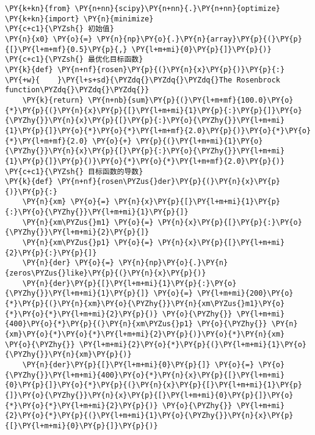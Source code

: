    \begin{tcolorbox}[breakable, size=fbox, boxrule=1pt, pad at break*=1mm,colback=cellbackground, colframe=cellborder]
\begin{Verbatim}[commandchars=\\\{\}]
\PY{k+kn}{from} \PY{n+nn}{scipy}\PY{n+nn}{.}\PY{n+nn}{optimize} \PY{k+kn}{import} \PY{n}{minimize}
\PY{c+c1}{\PYZsh{} 初始值}
\PY{n}{x0} \PY{o}{=} \PY{n}{np}\PY{o}{.}\PY{n}{array}\PY{p}{(}\PY{p}{[}\PY{l+m+mf}{0.5}\PY{p}{,} \PY{l+m+mi}{0}\PY{p}{]}\PY{p}{)}
\PY{c+c1}{\PYZsh{} 最优化目标函数}
\PY{k}{def} \PY{n+nf}{rosen}\PY{p}{(}\PY{n}{x}\PY{p}{)}\PY{p}{:}
\PY{+w}{    }\PY{l+s+sd}{\PYZdq{}\PYZdq{}\PYZdq{}The Rosenbrock function\PYZdq{}\PYZdq{}\PYZdq{}}
    \PY{k}{return} \PY{n+nb}{sum}\PY{p}{(}\PY{l+m+mf}{100.0}\PY{o}{*}\PY{p}{(}\PY{n}{x}\PY{p}{[}\PY{l+m+mi}{1}\PY{p}{:}\PY{p}{]}\PY{o}{\PYZhy{}}\PY{n}{x}\PY{p}{[}\PY{p}{:}\PY{o}{\PYZhy{}}\PY{l+m+mi}{1}\PY{p}{]}\PY{o}{*}\PY{o}{*}\PY{l+m+mf}{2.0}\PY{p}{)}\PY{o}{*}\PY{o}{*}\PY{l+m+mf}{2.0} \PY{o}{+} \PY{p}{(}\PY{l+m+mi}{1}\PY{o}{\PYZhy{}}\PY{n}{x}\PY{p}{[}\PY{p}{:}\PY{o}{\PYZhy{}}\PY{l+m+mi}{1}\PY{p}{]}\PY{p}{)}\PY{o}{*}\PY{o}{*}\PY{l+m+mf}{2.0}\PY{p}{)}
\PY{c+c1}{\PYZsh{} 目标函数的导数}
\PY{k}{def} \PY{n+nf}{rosen\PYZus{}der}\PY{p}{(}\PY{n}{x}\PY{p}{)}\PY{p}{:}
    \PY{n}{xm} \PY{o}{=} \PY{n}{x}\PY{p}{[}\PY{l+m+mi}{1}\PY{p}{:}\PY{o}{\PYZhy{}}\PY{l+m+mi}{1}\PY{p}{]}
    \PY{n}{xm\PYZus{}m1} \PY{o}{=} \PY{n}{x}\PY{p}{[}\PY{p}{:}\PY{o}{\PYZhy{}}\PY{l+m+mi}{2}\PY{p}{]}
    \PY{n}{xm\PYZus{}p1} \PY{o}{=} \PY{n}{x}\PY{p}{[}\PY{l+m+mi}{2}\PY{p}{:}\PY{p}{]}
    \PY{n}{der} \PY{o}{=} \PY{n}{np}\PY{o}{.}\PY{n}{zeros\PYZus{}like}\PY{p}{(}\PY{n}{x}\PY{p}{)}
    \PY{n}{der}\PY{p}{[}\PY{l+m+mi}{1}\PY{p}{:}\PY{o}{\PYZhy{}}\PY{l+m+mi}{1}\PY{p}{]} \PY{o}{=} \PY{l+m+mi}{200}\PY{o}{*}\PY{p}{(}\PY{n}{xm}\PY{o}{\PYZhy{}}\PY{n}{xm\PYZus{}m1}\PY{o}{*}\PY{o}{*}\PY{l+m+mi}{2}\PY{p}{)} \PY{o}{\PYZhy{}} \PY{l+m+mi}{400}\PY{o}{*}\PY{p}{(}\PY{n}{xm\PYZus{}p1} \PY{o}{\PYZhy{}} \PY{n}{xm}\PY{o}{*}\PY{o}{*}\PY{l+m+mi}{2}\PY{p}{)}\PY{o}{*}\PY{n}{xm} \PY{o}{\PYZhy{}} \PY{l+m+mi}{2}\PY{o}{*}\PY{p}{(}\PY{l+m+mi}{1}\PY{o}{\PYZhy{}}\PY{n}{xm}\PY{p}{)}
    \PY{n}{der}\PY{p}{[}\PY{l+m+mi}{0}\PY{p}{]} \PY{o}{=} \PY{o}{\PYZhy{}}\PY{l+m+mi}{400}\PY{o}{*}\PY{n}{x}\PY{p}{[}\PY{l+m+mi}{0}\PY{p}{]}\PY{o}{*}\PY{p}{(}\PY{n}{x}\PY{p}{[}\PY{l+m+mi}{1}\PY{p}{]}\PY{o}{\PYZhy{}}\PY{n}{x}\PY{p}{[}\PY{l+m+mi}{0}\PY{p}{]}\PY{o}{*}\PY{o}{*}\PY{l+m+mi}{2}\PY{p}{)} \PY{o}{\PYZhy{}} \PY{l+m+mi}{2}\PY{o}{*}\PY{p}{(}\PY{l+m+mi}{1}\PY{o}{\PYZhy{}}\PY{n}{x}\PY{p}{[}\PY{l+m+mi}{0}\PY{p}{]}\PY{p}{)}

\end{Verbatim}
\end{tcolorbox}
